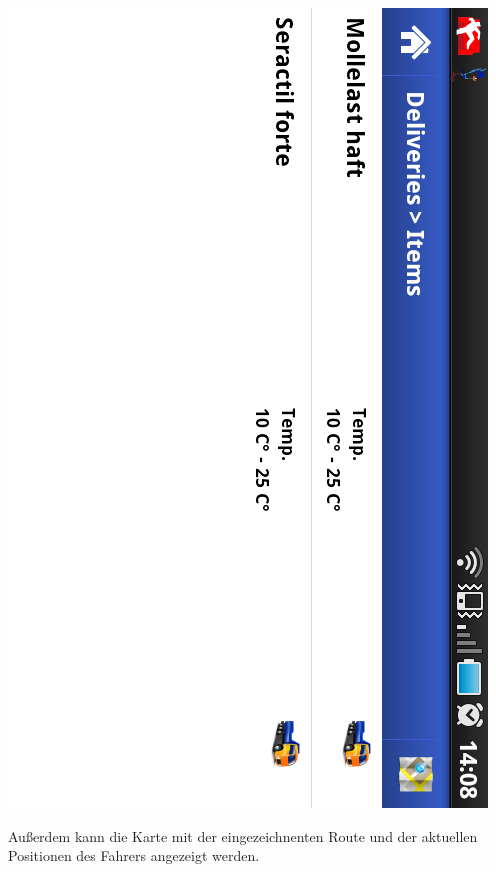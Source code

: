\includegraphics{../files/android_app_deliveries.png}

Außerdem kann die Karte mit der eingezeichnenten Route und der aktuellen Positionen des Fahrers angezeigt werden.

